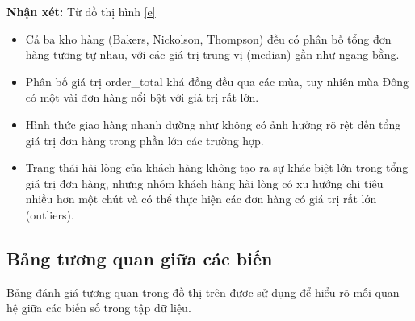 \textbf{Nhận xét:} Từ đồ thị hình \ref{e}
\begin{itemize}
    \item Cả ba kho hàng (Bakers, Nickolson, Thompson) đều có phân bố tổng đơn hàng tương tự nhau, với các giá trị trung vị (median) gần như ngang bằng.
    \item Phân bố giá trị order\_total khá đồng đều qua các mùa, tuy nhiên mùa Đông có một vài đơn hàng nổi bật với giá trị rất lớn.
    \item Hình thức giao hàng nhanh dường như không có ảnh hưởng rõ rệt đến tổng giá trị đơn hàng trong phần lớn các trường hợp.
    \item Trạng thái hài lòng của khách hàng không tạo ra sự khác biệt lớn trong tổng giá trị đơn hàng, nhưng nhóm khách hàng hài lòng có xu hướng chi tiêu nhiều hơn một chút và có thể thực hiện các đơn hàng có giá trị rất lớn (outliers).
\end{itemize}


\subsection{Bảng tương quan giữa các biến}
Bảng đánh giá tương quan trong đồ thị trên được sử dụng để hiểu rõ mối quan hệ giữa các biến số trong tập dữ liệu.

